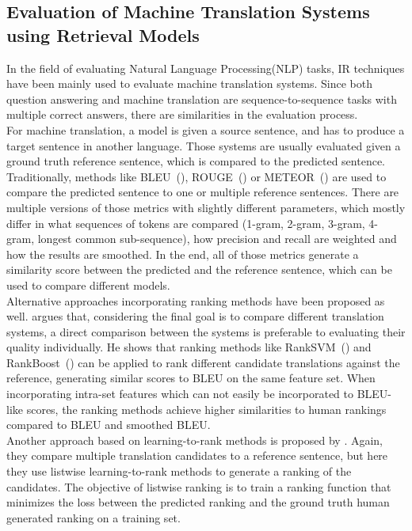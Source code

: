 \subsection{Evaluation of Machine Translation Systems using Retrieval Models}\label{sec:eval-mts-ir}
In the field of evaluating Natural Language Processing(NLP) tasks, IR techniques have been mainly used to evaluate machine translation systems.
Since both question answering and machine translation are sequence-to-sequence tasks with multiple correct answers, there are similarities in the evaluation process.
\\
For machine translation, a model is given a source sentence, and has to produce a target sentence in another language.
Those systems are usually evaluated given a ground truth reference sentence, which is compared to the predicted sentence.
Traditionally, methods like BLEU~(\cite{papineni:2002:Bleu}), ROUGE~(\cite{lin:2004:Rouge}) or METEOR~(\cite{banerjee:2005:METEOR}) are used to compare the predicted sentence to one or multiple reference sentences.
There are multiple versions of those metrics with slightly different parameters, which mostly differ in what sequences of tokens are compared (1-gram, 2-gram, 3-gram, 4-gram, longest common sub-sequence), how precision and recall are weighted and how the results are smoothed.
In the end, all of those metrics generate a similarity score between the predicted and the reference sentence, which can be used to compare different models.
\\
Alternative approaches incorporating ranking methods have been proposed as well.
\cite{duh:2008:Ranking} argues that, considering the final goal is to compare different translation systems, a direct comparison between the systems is preferable to evaluating their quality individually.
He shows that ranking methods like RankSVM~(\cite{joachims:2002:Optimizing}) and RankBoost~(\cite{freund:2003:An}) can be applied to rank different candidate translations against the reference, generating similar scores to BLEU on the same feature set.
When incorporating intra-set features which can not easily be incorporated to BLEU-like scores, the ranking methods achieve higher similarities to human rankings compared to BLEU and smoothed BLEU.
\\
Another approach based on learning-to-rank methods is proposed by \cite{li:2013:Listwise}.
Again, they compare multiple translation candidates to a reference sentence, but here they use listwise learning-to-rank methods to generate a ranking of the candidates.
The objective of listwise ranking is to train a ranking function that minimizes the loss between the predicted ranking and the ground truth human generated ranking on a training set.
